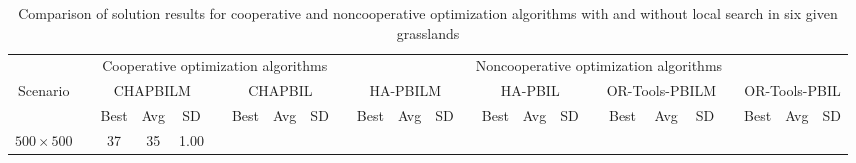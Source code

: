 \documentclass[preprint,5pt]{elsarticle}
\begin{document}
\begin{table}[htbp]
\scriptsize
\centering
\begin{threeparttable}
\caption{Comparison of solution results for cooperative and noncooperative optimization algorithms  with and without local search in six given grasslands}\label{Local-Search-Solution-results}
\begin{center}
\setlength{\tabcolsep}{0.40em}
\begin{tabular}{ccccccccccccccccccccccccc}
\hline\hline%
&\multicolumn{1}{c}{}  &\multicolumn{7}{c}{Cooperative optimization algorithms}   &\multicolumn{1}{c}{} &\multicolumn{15}{c}{Noncooperative optimization algorithms} \\
\cline{3-9} \cline{11-25}
\multicolumn{1}{c}{Scenario}  &\multicolumn{1}{c}{}  &\multicolumn{3}{c}{CHAPBILM}   &\multicolumn{1}{c}{} &\multicolumn{3}{c}{CHAPBIL}   &\multicolumn{1}{c}{} &\multicolumn{3}{c}{HA-PBILM}  &\multicolumn{1}{c}{} &\multicolumn{3}{c}{HA-PBIL} &\multicolumn{1}{c}{} &\multicolumn{3}{c}{OR-Tools-PBILM}  &\multicolumn{1}{c}{} &\multicolumn{3}{c}{OR-Tools-PBIL} \\
\cline{3-5} \cline{7-9} \cline{11-13} \cline{15-17} \cline{19-21} \cline{23-25} %
    &&Best &Avg &SD   &&Best &Avg &SD  &&Best &Avg &SD  &&Best &Avg &SD  &&Best &Avg &SD  &&Best &Avg &SD \\
\hline
  $500\times 500$   &&{\cellcolor[rgb]{0.729,0.729,0.729}}37 &{\cellcolor[rgb]{0.729,0.729,0.729}}35   &{\cellcolor[rgb]{0.729,0.729,0.729}}1.00

\end{tabular}
\end{center}
\end{threeparttable}
\end{table}
\end{document}
